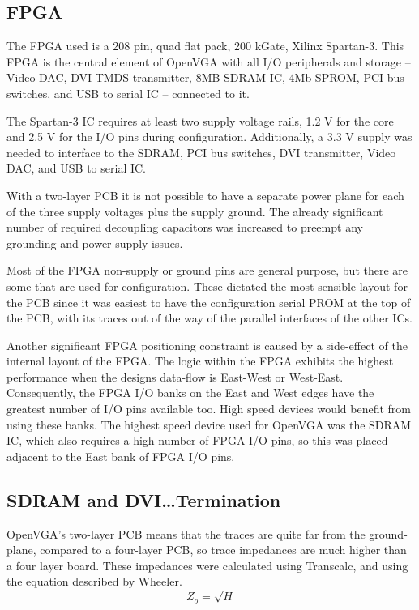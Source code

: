 \subsection{FPGA}
The FPGA used is a 208 pin, quad flat pack, 200 kGate, Xilinx Spartan-3. This
FPGA is the central element of OpenVGA with all I/O peripherals and storage --
Video DAC, DVI TMDS transmitter, 8MB SDRAM IC, 4Mb SPROM, PCI bus switches, and
USB to serial IC -- connected to it.

The Spartan-3 IC requires at least two supply voltage rails, 1.2 V for the core
and 2.5 V for the I/O pins during configuration. Additionally, a 3.3 V supply was
needed to interface to the SDRAM, PCI bus switches, DVI transmitter, Video DAC,
and USB to serial IC.

With a two-layer PCB it is not possible to have a separate power plane for each
of the three supply voltages plus the supply ground. The already significant
number of required decoupling capacitors\cite{Xilinx_Decoupling} was increased to
preempt any grounding and power supply issues.

Most of the FPGA non-supply or ground pins are general purpose, but there are
some that are used for configuration. These dictated the most sensible layout for
the PCB since it was easiest to have the configuration serial PROM at the top of
the PCB, with its traces out of the way of the parallel interfaces of the other
ICs.

Another significant FPGA positioning constraint is caused by a side-effect of the
internal layout of the FPGA. The logic within the FPGA exhibits the highest
performance when the designs data-flow is East-West or West-East. Consequently,
the FPGA I/O banks on the East and West edges have the greatest number of I/O
pins available too. High speed devices would benefit from using these banks. The
highest speed device used for OpenVGA was the SDRAM IC, which also requires a high
number of FPGA I/O pins, so this was placed adjacent to the East bank of FPGA I/O
pins.


\subsection{SDRAM and DVI\ldots Termination}
OpenVGA's two-layer PCB means that the traces are quite far from the ground-plane,
compared to a four-layer PCB, so trace impedances are much higher than a four
layer board. These impedances were calculated using Transcalc, and using the
equation described by Wheeler\cite{wheeler1977mtt}.
\begin{equation}
Z_o	= \sqrt{H}
\end{equation}


